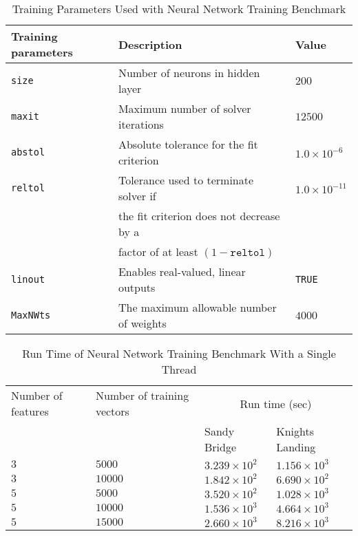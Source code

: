 \begin{table*}
  \caption{Training Parameters Used with Neural Network Training Benchmark}
  \label{tab:nnetParams}
  \begin{tabular}{lll}
    \toprule
    Training parameters & Description & Value\\
    \midrule
      \texttt{size}     & Number of neurons in hidden layer        & $200$ \\
      \texttt{maxit}    & Maximum number of solver iterations      & $12500$ \\
      \texttt{abstol}   & Absolute tolerance for the fit criterion & $1.0\times 10^{-6}$\\
      \texttt{reltol}   & Tolerance used to terminate solver if    & $1.0\times 10^{-11}$\\
                        & the fit criterion does not decrease by a &\\
                        & factor of at least $(1-\mathrm{\texttt{reltol}})$ &\\
      \texttt{linout}   & Enables real-valued, linear outputs      & \texttt{TRUE}\\
      \texttt{MaxNWts}  & The maximum allowable number of weights  & $4000$\\
    \bottomrule
  \end{tabular}
\end{table*}

\begin{table*}
  \caption{Run Time of Neural Network Training Benchmark With a Single Thread}
  \label{tab:nnetResults}
  \begin{tabular}{llll}
    \toprule
      Number of features & Number of training vectors & \multicolumn{2}{c}{Run time (sec)}\\
                         &                            & Sandy Bridge & Knights Landing\\
    \midrule
    $3$ & $5000$  & $3.239\times 10^{2}$ & $1.156\times 10^{3}$ \\
    $3$ & $10000$ & $1.842\times 10^{2}$ & $6.690\times 10^{2}$ \\
    $5$ & $5000$  & $3.520\times 10^{2}$ & $1.028\times 10^{3}$ \\
    $5$ & $10000$ & $1.536\times 10^{3}$ & $4.664\times 10^{3}$ \\
    $5$ & $15000$ & $2.660\times 10^{3}$ & $8.216\times 10^{3}$ \\
    \bottomrule
  \end{tabular}
\end{table*}

